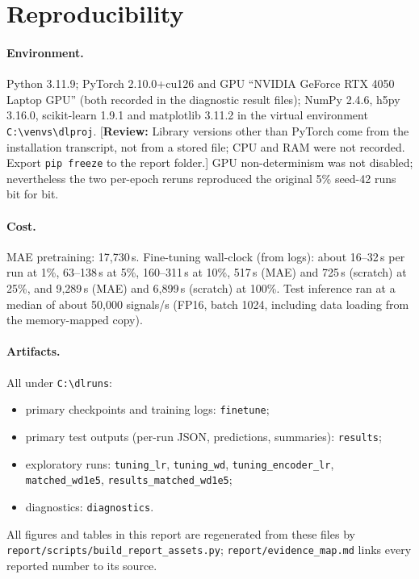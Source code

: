 \documentclass[11pt,a4paper]{article}
\newcommand{\reviewnote}[1]{\textcolor{red!70!black}{[\textbf{Review:} #1]}}
\begin{document}
\section{Reproducibility}\label{sec:repro}
\paragraph{Environment.} Python 3.11.9; PyTorch 2.10.0+cu126 and GPU ``NVIDIA GeForce RTX 4050 Laptop GPU'' (both recorded in the diagnostic result files); NumPy 2.4.6, h5py 3.16.0, scikit-learn 1.9.1 and matplotlib 3.11.2 in the virtual environment \texttt{C:\textbackslash venvs\textbackslash dlproj}.
\reviewnote{Library versions other than PyTorch come from the installation transcript, not from a stored file; CPU and RAM were not recorded. Export \texttt{pip freeze} to the report folder.}
GPU non-determinism was not disabled; nevertheless the two per-epoch reruns reproduced the original 5\% seed-42 runs bit for bit.

\paragraph{Cost.} MAE pretraining: 17,730\,s. Fine-tuning wall-clock (from logs): about 16--32\,s per run at 1\%, 63--138\,s at 5\%, 160--311\,s at 10\%, 517\,s (MAE) and 725\,s (scratch) at 25\%, and 9,289\,s (MAE) and 6,899\,s (scratch) at 100\%. Test inference ran at a median of about 50,000 signals/s (FP16, batch 1024, including data loading from the memory-mapped copy).

{\raggedright\paragraph{Artifacts.} All under \texttt{C:\textbackslash dlruns}:
\begin{itemize}
\item primary checkpoints and training logs: \texttt{finetune};
\item primary test outputs (per-run JSON, predictions, summaries): \texttt{results};
\item exploratory runs: \texttt{tuning\_lr}, \texttt{tuning\_wd}, \texttt{tuning\_encoder\_lr}, \texttt{matched\_wd1e5}, \texttt{results\_matched\_wd1e5};
\item diagnostics: \texttt{diagnostics}.
\end{itemize}
All figures and tables in this report are regenerated from these files by \texttt{report/scripts/build\_report\_assets.py}; \texttt{report/evidence\_map.md} links every reported number to its source.\par}
\end{document}
